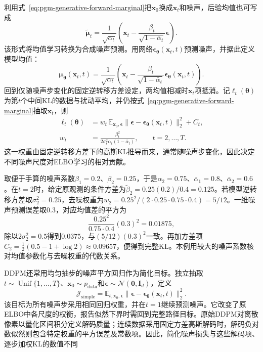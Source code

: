 利用式~\eqref{eq:pgm-generative-forward-marginal}把$\bm{x}_0$换成$\bm{x}_t$和噪声，后验均值也可写成
\[
  \widetilde{\bm{\mu}}_t
  =\frac{1}{\sqrt{\alpha_t}}
       \left(\bm{x}_t-
          \frac{\beta_t}{\sqrt{1-\bar{\alpha}_t}}\bm{\epsilon}\right).
\]
该形式将均值学习转换为合成噪声预测。用网络$\bm{\epsilon}_{\bm{\theta}}(\bm{x}_t,t)$预测噪声，并据此定义模型均值：
\begin{equation}
  \label{eq:pgm-generative-noise-parameterization}
  \bm{\mu}_{\bm{\theta}}(\bm{x}_t,t)
  =\frac{1}{\sqrt{\alpha_t}}
       \left(\bm{x}_t-
          \frac{\beta_t}{\sqrt{1-\bar{\alpha}_t}}
               \bm{\epsilon}_{\bm{\theta}}(\bm{x}_t,t)\right).
\end{equation}
回到仅随噪声步变化的固定逆转移方差设定，两均值相减时$\bm{x}_t$项抵消。记$\ell_t(\bm{\theta})$为第$t$个中间KL的数据与扰动平均，并仍按式~\eqref{eq:pgm-generative-forward-marginal}抽取$\bm{x}_t$，则
\begin{equation}
  \label{eq:pgm-generative-weighted-denoising}
  \begin{aligned}
    \ell_t(\bm{\theta})
      &=w_t\,\mathbb{E}_{\bm{x}_0,\bm{\epsilon}}
         \lVert\bm{\epsilon}
          -\bm{\epsilon}_{\bm{\theta}}(\bm{x}_t,t)\rVert_2^2+C_t,\\
    w_t&=\frac{\beta_t^2}
              {2\sigma_t^2\alpha_t(1-\bar{\alpha}_t)},
          \qquad t=2,\ldots,T.
  \end{aligned}
\end{equation}
这一权重由固定逆转移方差下的高斯KL推导而来，通常随噪声步变化，因此决定不同噪声尺度对ELBO学习的相对贡献。

\begin{example}[核对一个扩散步的权重]
  \label{ex:pgm-generative-step-weight}
  取便于手算的噪声系数$\beta_1=0.2$、$\beta_2=0.25$，于是$\alpha_2=0.75$、$\bar{\alpha}_1=0.8$、$\bar{\alpha}_2=0.6$。在$t=2$时，给定原观测的条件方差为$\widetilde{\beta}_2=0.25(0.2)/0.4=0.125$。若模型逆转移方差取$\sigma_2^2=0.25$，去噪权重为$w_2=0.25^2/(2\cdot0.25\cdot0.75\cdot0.4)=5/12$。一维噪声预测误差取$0.3$，对应均值差的平方为
  \[
    \frac{0.25^2}{0.75\cdot0.4}(0.3)^2=0.01875,
  \]
  除以$2\sigma_2^2=0.5$得到$0.0375$，与$(5/12)(0.3)^2$一致。再加方差项$C_2=\tfrac12(0.5-1+\log2)\approx0.09657$，便得到完整KL。本例用较大的噪声系数核对均值参数化与去噪权重的代数关系。
\end{example}

DDPM还常用均匀抽步的噪声平方回归作为简化目标。独立抽取$t\sim\operatorname{Unif}\{1,\ldots,T\}$、$\bm{x}_0\sim p_{\mathrm{data}}$和$\bm{\epsilon}\sim\mathcal{N}(\bm{0},\bm{I}_d)$，定义
\begin{equation}
  \label{eq:pgm-generative-simple-loss}
  \mathcal{J}_{\mathrm{simple}}
  =\mathbb{E}_{t,\bm{x}_0,\bm{\epsilon}}
      \lVert\bm{\epsilon}
       -\bm{\epsilon}_{\bm{\theta}}(\bm{x}_t,t)\rVert_2^2.
\end{equation}
该目标为所有噪声步采用相同回归权重，并在$t=1$继续预测噪声。它改变了原ELBO中各尺度的权衡，报告似然下界时需回到完整路径目标。原始DDPM对离散像素以量化区间积分定义解码质量；连续数据采用固定方差高斯解码时，解码负对数似然则包含特定权重的平方误差及常数项。因此，简化噪声损失与这些解码项、逐步加权KL的数值不同

